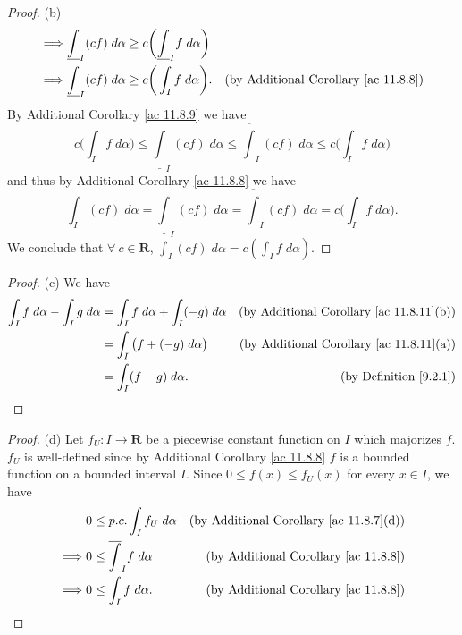 \begin{proof}{(b)}
\begin{align*}
        \implies & \underline{\int}_I (cf) \; d \alpha \geq c\bigg(\underline{\int}_I f \; d \alpha\bigg)                                                                                                   \\
        \implies & \underline{\int}_I (cf) \; d \alpha \geq c\bigg(\int_I f \; d \alpha\bigg).                                                        & \text{(by Additional Corollary \ref{ac 11.8.8})}
    \end{align*}
    By Additional Corollary \ref{ac 11.8.9} we have
    \[
        c\bigg(\int_I f \; d \alpha\bigg) \leq \underline{\int}_I (cf) \; d \alpha \leq \overline{\int}_I (cf) \; d \alpha \leq c\bigg(\int_I f \; d \alpha\bigg)
    \]
    and thus by Additional Corollary \ref{ac 11.8.8} we have
    \[
        \int_I (cf) \; d \alpha = \underline{\int}_I (cf) \; d \alpha = \overline{\int}_I (cf) \; d \alpha = c\bigg(\int_I f \; d \alpha\bigg).
    \]
    We conclude that \(\forall\ c \in \mathbf{R}\), \(\int_I (cf) \; d \alpha = c (\int_I f \; d \alpha)\).
\end{proof}

\begin{proof}{(c)}
    We have
    \begin{align*}
        \int_I f \; d \alpha - \int_I g \; d \alpha & = \int_I f \; d \alpha + \int_I (-g) \; d \alpha & \text{(by Additional Corollary \ref{ac 11.8.11}(b))} \\
                                                    & = \int_I \big(f + (-g) \; d \alpha\big)          & \text{(by Additional Corollary \ref{ac 11.8.11}(a))} \\
                                                    & = \int_I (f - g) \; d \alpha.                    & \text{(by Definition \ref{9.2.1})}
    \end{align*}
\end{proof}

\begin{proof}{(d)}
    Let \(f_U : I \to \mathbf{R}\) be a piecewise constant function on \(I\) which majorizes \(f\).
    \(f_U\) is well-defined since by Additional Corollary \ref{ac 11.8.8} \(f\) is a bounded function on a bounded interval \(I\).
    Since \(0 \leq f(x) \leq f_U(x)\) for every \(x \in I\), we have
    \begin{align*}
                 & 0 \leq p.c. \int_I f_U \; d \alpha     & \text{(by Additional Corollary \ref{ac 11.8.7}(d))} \\
        \implies & 0 \leq \overline{\int}_I f \; d \alpha & \text{(by Additional Corollary \ref{ac 11.8.8})}    \\
        \implies & 0 \leq \int_I f \; d \alpha.           & \text{(by Additional Corollary \ref{ac 11.8.8})}
    \end{align*}
\end{proof}

